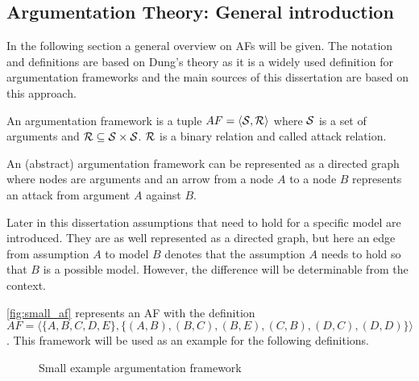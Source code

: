 \subsection{Argumentation Theory: General introduction}
\label{sub:dung}
In the following section a general overview on \glspl{AF} will be given. The notation and definitions are based on Dung's theory \cite{dung1995} as it is a widely used definition for argumentation frameworks and the main sources of this dissertation \cite{sassoon2014,sassoon2016CD,Modgil2009} are based on this approach.
\begin{definition}
	An argumentation framework is a tuple $AF = \langle \S, \R \rangle$ where $\S$ is a set of arguments and $ \R \subseteq \S \times \S$. $\R$ is a binary relation and called attack relation.
\end{definition}


An (abstract) argumentation framework can be represented as a directed graph where nodes are arguments and an arrow from a node $A$ to a node $B$ represents an attack from argument $A$ against $B$.

\begin{remark}
	Later in this dissertation assumptions that need to hold for a specific model are introduced. They are as well represented as a directed graph, but here an edge from assumption $A$ to model $B$ denotes that the assumption $A$ needs to hold so that $B$ is a possible model. However, the difference will be determinable from the context.
\end{remark}


\begin{exa}
 \autoref{fig:small_af} represents an \gls{AF} with the definition $AF = \langle \{A, B, C, D, E\}, \allowbreak \{(A,B), (B, C),\allowbreak (B, E), (C, B),\allowbreak (D,C), (D,D)\} \rangle $. This framework will be used as an example for the following definitions.
\end{exa}


\begin{figure}[h]
\centering
{}
\caption{Small example argumentation framework}
\label{fig:small_af}
\end{figure}


